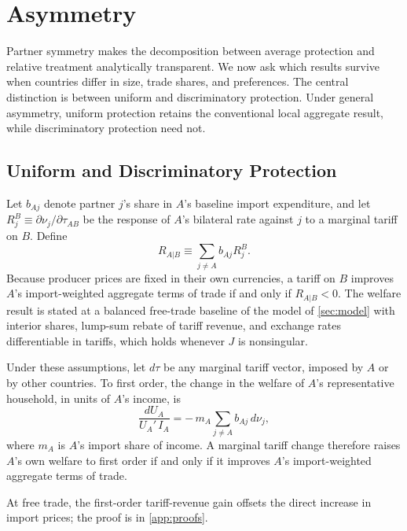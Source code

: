 \section{Asymmetry}
\label{sec:asymmetry}

Partner symmetry makes the decomposition between average protection and relative treatment analytically transparent. We now ask which results survive when countries differ in size, trade shares, and preferences. The central distinction is between uniform and discriminatory protection. Under general asymmetry, uniform protection retains the conventional local aggregate result, while discriminatory protection need not.

\subsection{Uniform and Discriminatory Protection}

Let $b_{Aj}$ denote partner $j$'s share in $A$'s baseline import expenditure, and let $R^B_j\equiv\partial\nu_j/\partial\tau_{AB}$ be the response of $A$'s bilateral rate against $j$ to a marginal tariff on $B$. Define
\begin{equation}
R_{A|B}\equiv\sum_{j\neq A}b_{Aj}R^B_j.
\end{equation}
Because producer prices are fixed in their own currencies, a tariff on $B$ improves $A$'s import-weighted aggregate terms of trade if and only if $R_{A|B}<0$. The welfare result is stated at a balanced free-trade baseline of the model of \cref{sec:model} with interior shares, lump-sum rebate of tariff revenue, and exchange rates differentiable in tariffs, which holds whenever $J$ is nonsingular.

\begin{lemma}
\label{lem:welfare}
Under these assumptions, let $d\tau$ be any marginal tariff vector, imposed by $A$ or by other countries. To first order, the change in the welfare of $A$'s representative household, in units of $A$'s income, is
\begin{equation}
\frac{dU_A}{U_A'\,I_A}=-\,m_A\sum_{j\neq A}b_{Aj}\,d\nu_j,
\end{equation}
where $m_A$ is $A$'s import share of income. A marginal tariff change therefore raises $A$'s own welfare to first order if and only if it improves $A$'s import-weighted aggregate terms of trade.
\end{lemma}

\noindent At free trade, the first-order tariff-revenue gain offsets the direct increase in import prices; the proof is in \cref{app:proofs}.

